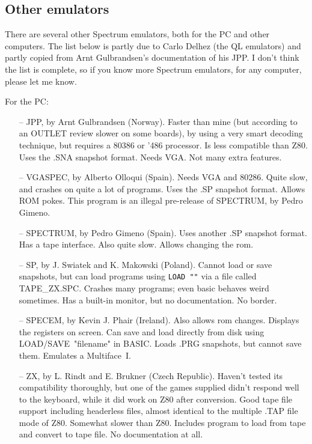 \subsection{Other emulators}

    There are several other Spectrum emulators, both for the PC and other
    computers.  The list below is partly due to Carlo Delhez (the QL
    emulators) and partly copied from Arnt Gulbrandsen's documentation of
    his JPP\@.  I don't think the list is complete, so if you know more
    Spectrum emulators, for any computer, please let me know.

\noindent
    For the PC:
\begin{itemize}
  \item[--] JPP, by Arnt Gulbrandsen (Norway).  Faster than mine (but according
      to an OUTLET review slower on some boards), by using a very smart
      decoding technique, but requires a 80386 or '486 processor.  Is less
      compatible than Z80.  Uses the .SNA snapshot format.  Needs VGA\@.
      Not many extra features.
  \item[--] VGASPEC, by Alberto Olloqui (Spain).  Needs VGA and 80286.  Quite
      slow, and crashes on quite a lot of programs.  Uses the .SP snapshot
      format.  Allows ROM pokes.  This program is an illegal pre-release
      of SPECTRUM, by Pedro Gimeno.
  \item[--] SPECTRUM, by Pedro Gimeno (Spain).  Uses another .SP snapshot
      format.  Has a tape interface.  Also quite slow.  Allows changing
      the rom.
  \item[--] SP, by J. Swiatek and K. Makowski (Poland).  Cannot load or save
      snapshots, but can load programs using \verb|LOAD ""| via a file called
      TAPE\_ZX.SPC\@.  Crashes many programs; even basic behaves weird
      sometimes.  Has a built-in monitor, but no documentation.  No
      border.
  \item[--] SPECEM, by Kevin J. Phair (Ireland).  Also allows rom changes.
      Displays the registers on screen.  Can save and load directly
      from disk using LOAD/SAVE~"filename" in BASIC\@.  Loads .PRG
      snapshots, but cannot save them.  Emulates a Multiface~I.
  \item[--] ZX, by L. Rindt and E. Brukner (Czech Republic).  Haven't tested
      its compatibility thoroughly, but one of the games supplied didn't
      respond well to the keyboard, while it did work on Z80 after
      conversion.  Good tape file support including headerless files,
      almost identical to the multiple .TAP file mode of Z80.  Somewhat
      slower than Z80.  Includes program to load from tape and convert
      to tape file.  No documentation at all.
\end{itemize}
